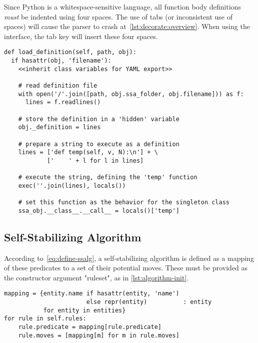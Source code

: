 \begin{warning}
  Since Python is a whitespace-sensitive language,
    all function body definitions \emph{must} be indented
    using four spaces.
  The use of tabs (or inconsistent use of spaces)
    will cause the parser to crash at~\autoref{lst:decorate:overview}.
  When using the interface, the tab key will insert these four spaces.
\end{warning} %

\begin{lstlisting}[float, caption={Predicates and moves are defined by named files in the bundle.  See also~\autoref{task:smarter-def}.}, label={lst:decorate:overview}]
def load_definition(self, path, obj):
  if hasattr(obj, 'filename'):
    <<inherit class variables for YAML export>>

    # read definition file
    with open('/'.join([path, obj.ssa_folder, obj.filename])) as f:
      lines = f.readlines()

    # store the definition in a 'hidden' variable
    obj._definition = lines

    # prepare a string to execute as a definition
    lines = ['def temp(self, v, N):\n'] + \
            ['    ' + l for l in lines]

    # execute the string, defining the 'temp' function
    exec(''.join(lines), locals())

    # set this function as the behavior for the singleton class
    ssa_obj.__class__.__call__ = locals()['temp']
\end{lstlisting}

\subsection{Self-Stabilizing Algorithm}
\label{sec:logic-repr:self-stab-algor}

According to~\autoref{eq:define-ssalg},
  a self-stabilizing algorithm is defined as a mapping
  of these predicates to a set of their potential moves.
These must be provided as the constructor argument "ruleset",
  as in \autoref{lst:algorithm-init}.
\begin{lstlisting}[float, caption={Each rule must be resolved \emph{after} all predicates and moves have been defined.}, label={lst:algorithm-init}]
mapping = {entity.name if hasattr(entity, 'name')
                       else repr(entity)          : entity
           for entity in entities}
for rule in self.rules:
    rule.predicate = mapping[rule.predicate]
    rule.moves = [mapping[m] for m in rule.moves]
\end{lstlisting}

